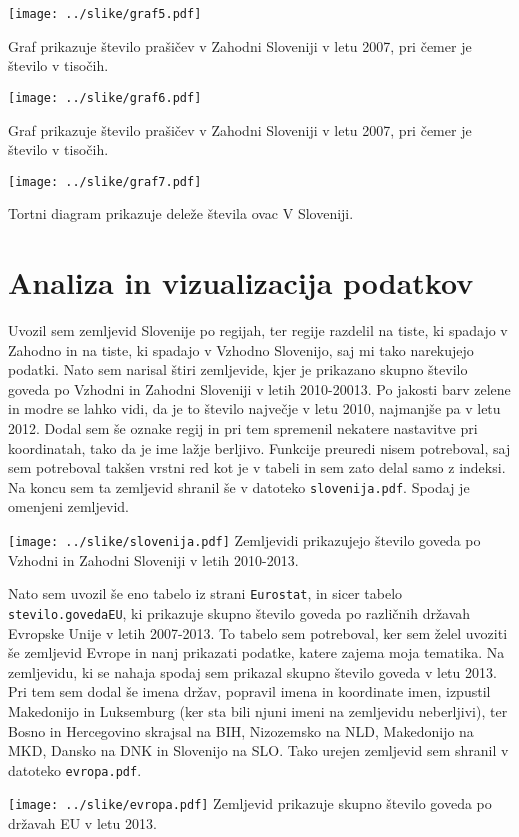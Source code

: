 \documentclass[11pt,a4paper]{article}
\begin{document}
\texttt{[image: ../slike/graf5.pdf]}

Graf prikazuje število prašičev v Zahodni Sloveniji v letu 2007, pri čemer je število v tisočih.

\texttt{[image: ../slike/graf6.pdf]}

Graf prikazuje število prašičev v Zahodni Sloveniji v letu 2007, pri čemer je število v tisočih.

\texttt{[image: ../slike/graf7.pdf]}

Tortni diagram prikazuje deleže števila ovac V Sloveniji.


\newpage
\section{Analiza in vizualizacija podatkov}
Uvozil sem zemljevid Slovenije po regijah, ter regije razdelil na tiste, ki spadajo v Zahodno in na tiste, ki spadajo v Vzhodno Slovenijo, saj mi tako narekujejo podatki. Nato sem narisal štiri zemljevide, kjer je prikazano skupno število goveda po Vzhodni in Zahodni Sloveniji v letih 2010-20013. Po jakosti barv zelene in modre se lahko vidi, da je to število največje v letu 2010, najmanjše pa v letu 2012. Dodal sem še oznake regij in pri tem spremenil nekatere nastavitve pri koordinatah, tako da je ime lažje berljivo. Funkcije preuredi nisem potreboval, saj sem potreboval takšen vrstni red kot je v tabeli in sem zato delal samo z indeksi. Na koncu sem ta zemljevid shranil še v datoteko \verb|slovenija.pdf|. Spodaj je omenjeni zemljevid.

\texttt{[image: ../slike/slovenija.pdf]}
Zemljevidi prikazujejo število goveda po Vzhodni in Zahodni Sloveniji v letih 2010-2013.

\pagebreak
\noindent Nato sem uvozil še eno tabelo iz strani \verb|Eurostat|, in sicer tabelo \verb|stevilo.govedaEU|, ki prikazuje skupno število goveda po različnih državah Evropske Unije v letih 2007-2013. To tabelo sem potreboval, ker sem želel uvoziti še zemljevid Evrope in nanj prikazati podatke, katere zajema moja tematika. Na zemljevidu, ki se nahaja spodaj sem prikazal skupno število goveda v letu 2013. Pri tem sem dodal še imena držav, popravil imena in  koordinate imen, izpustil Makedonijo in Luksemburg (ker sta bili njuni imeni na zemljevidu neberljivi), ter Bosno in Hercegovino skrajsal na BIH, Nizozemsko na NLD, Makedonijo na MKD, Dansko na DNK in Slovenijo na SLO. Tako urejen zemljevid sem shranil v datoteko \verb|evropa.pdf|.


\texttt{[image: ../slike/evropa.pdf]}
Zemljevid prikazuje skupno število goveda po državah EU v letu 2013.

\end{document}
